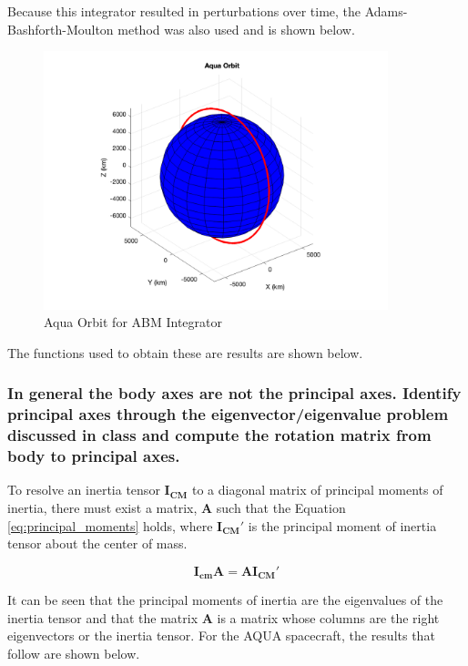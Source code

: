 Because this integrator resulted in perturbations over time, the Adams-Bashforth-Moulton method was also used and is shown below.

\begin{figure}[H]
    \centering
    \includegraphics[width = 10cm]{Images/ode23_orbit.png}
    \caption{Aqua Orbit for ABM Integrator}
    \label{fig:numerical_orbit_rk}
\end{figure}

The functions used to obtain these are results are shown below.





\subsubsection{In general the body axes are not the principal axes. Identify principal axes through the eigenvector/eigenvalue problem discussed in class and compute the rotation matrix from body to principal axes.} \label{sec:principal_inertia_def_and_calc}

To resolve an inertia tensor $\boldsymbol{I_{CM}}$ to a diagonal matrix of principal moments of inertia, there must exist a matrix, $\boldsymbol{A}$ such that the Equation \ref{eq:principal_moments} holds, where $\boldsymbol{I_{CM}'}$ is the principal moment of inertia tensor about the center of mass.

\begin{equation} \label{eq:principal_moments}
    \boldsymbol{I_{cm} A} = \boldsymbol{A I_{CM}'} 
\end{equation}

It can be seen that the principal moments of inertia are the eigenvalues of the inertia tensor and that the matrix $\boldsymbol{A}$ is a matrix whose columns are the right eigenvectors or the inertia tensor. For the AQUA spacecraft, the results that follow are shown below.

